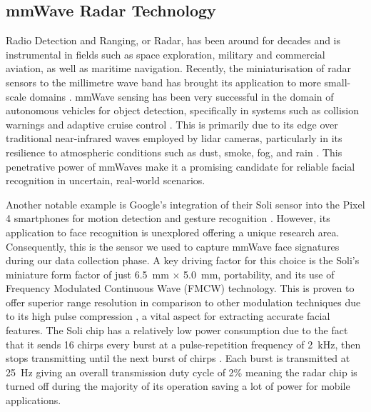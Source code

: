 \documentclass{mpaper}
\begin{document}
\subsection{mmWave Radar Technology}
Radio Detection and Ranging, or Radar, has been around for decades and is instrumental in fields such as space exploration, military and commercial aviation, as well as maritime navigation. Recently, the miniaturisation of radar sensors to the millimetre wave band has brought its application to more small-scale domains \cite{soumya2023recent}. mmWave sensing has been very successful in the domain of autonomous vehicles for object detection, specifically in systems such as collision warnings and adaptive cruise control \cite{dfrobot}. This is primarily due to its edge over traditional near-infrared waves employed by lidar cameras, particularly in its resilience to atmospheric conditions such as dust, smoke, fog, and rain \cite{cadenceblog2022}. This penetrative power of mmWaves make it a promising candidate for reliable facial recognition in uncertain, real-world scenarios. 

Another notable example is Google's integration of their Soli sensor into the Pixel 4 smartphones for motion detection and gesture recognition \cite{googleblog2020}. However, its application to face recognition is unexplored offering a unique research area. Consequently, this is the sensor we used to capture mmWave face signatures during our data collection phase. A key driving factor for this choice is the Soli's miniature form factor of just \qty{6.5}{\mm} $\times$ \qty{5.0}{\mm}, portability, and its use of Frequency Modulated Continuous Wave (FMCW) technology. This is proven to offer superior range resolution in comparison to other modulation techniques due to its high pulse compression \cite{mahafza2005radar}, a vital aspect for extracting accurate facial features. The Soli chip has a relatively low power consumption due to the fact that it sends 16 chirps every burst at a pulse-repetition frequency of \qty{2}{\kHz}, then stops transmitting until the next burst of chirps \cite{hayashi2021radarnet}. Each burst is transmitted at \qty{25}{\Hz} giving an overall transmission duty cycle of 2\% meaning the radar chip is turned off during the majority of its operation saving a lot of power for mobile applications.


\end{document}
